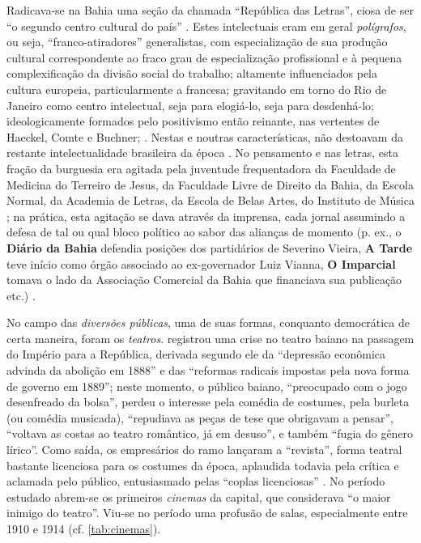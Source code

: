 Radicava-se na Bahia uma seção da chamada ``República das Letras'', ciosa de ser ``o segundo centro cultural do país'' \cite[p.~263]{machadoneto_bahiaint_1972}. Estes intelectuais eram em geral \textit{polígrafos}, ou seja, ``franco-atiradores'' generalistas, com especialização de sua produção cultural correspondente ao fraco grau de especialização profissional e à pequena complexificação da divisão social do trabalho; altamente influenciados pela cultura europeia, particularmente a francesa; gravitando em torno do Rio de Janeiro como centro intelectual, seja para elogiá-lo, seja para desdenhá-lo; ideologicamente formados pelo positivismo então reinante, nas vertentes de Haeckel, Comte e Buchner;  \cite{MachadoNeto1966,machadoneto_bahiaint_1972}.  Nestas e noutras características, não destoavam da restante intelectualidade brasileira da época \cite{martins_intelv5_1977,martins_intelv6_1978}. No pensamento e nas letras, esta fração da burguesia era agitada pela juventude frequentadora da Faculdade de Medicina do Terreiro de Jesus, da Faculdade Livre de Direito da Bahia, da Escola Normal, da Academia de Letras, da Escola de Belas Artes, do Instituto de Música \cite[p.~272]{machadoneto_bahiaint_1972}; na prática, esta agitação se dava através da imprensa, cada jornal assumindo a defesa de tal ou qual bloco político ao sabor das alianças de momento (p. ex., o \textbf{Diário da Bahia} defendia posições dos partidários de Severino Vieira, \textbf{A Tarde} teve início como órgão associado ao ex-governador Luiz Vianna, \textbf{O Imparcial} tomava o lado da Associação Comercial da Bahia que financiava sua publicação etc.) \cite{souza_imprensa_1972,machadoneto_bahiaint_1972}.

No campo das \textit{diversões públicas}, uma de suas formas, conquanto democrática de certa maneira, foram os \textit{teatros}.  registrou uma crise no teatro baiano na passagem do Império para a República, derivada segundo ele da ``depressão econômica advinda da abolição em 1888'' e das ``reformas radicais impostas pela nova forma de governo em 1889''; neste momento, o público baiano, ``preocupado com o jogo desenfreado da bolsa'', perdeu o interesse pela comédia de costumes, pela burleta (ou comédia musicada), ``repudiava as peças de tese que obrigavam a pensar'', ``voltava as costas ao teatro romântico, já em desuso'', e também ``fugia do gênero lírico''. Como saída, os empresários do ramo lançaram a ``revista'', forma teatral bastante licenciosa para os costumes da época, aplaudida todavia pela crítica e aclamada pelo público, entusiasmado pelas ``coplas licenciosas'' \cite[p.~48-49]{ruy_teatro_1959}. No período estudado abrem-se os primeiros \textit{cinemas} da capital, que  considerava ``o maior inimigo do teatro''. Viu-se no período uma profusão de salas, especialmente entre 1910 e 1914 (cf. \autoref{tab:cinemas}).

